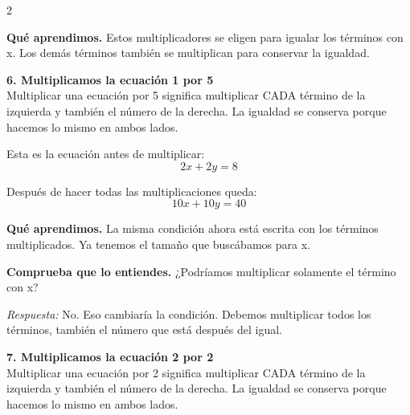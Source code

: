 \documentclass[11pt,a4paper,landscape]{article}
\begin{document}
\begin{multicols*}{2}
\begin{minipage}{\linewidth}
\par\smallskip\textbf{Qué aprendimos.} Estos multiplicadores se eligen para igualar los términos con x. Los demás términos también se multiplican para conservar la igualdad.
\end{minipage}\par\medskip
\noindent\begin{minipage}{\linewidth}\textbf{6. Multiplicamos la ecuación 1 por 5}\\[2pt]Multiplicar una ecuación por 5 significa multiplicar CADA término de la izquierda y también el número de la derecha. La igualdad se conserva porque hacemos lo mismo en ambos lados.
\par\smallskip Esta es la ecuación antes de multiplicar:
\[2x + 2y = 8\]
\par{}\par\smallskip
\par\smallskip Después de hacer todas las multiplicaciones queda:
\[10x + 10y = 40\]
\par\smallskip\textbf{Qué aprendimos.} La misma condición ahora está escrita con los términos multiplicados. Ya tenemos el tamaño que buscábamos para x.
\par\smallskip\textbf{Comprueba que lo entiendes.} ¿Podríamos multiplicar solamente el término con x?\par\textit{Respuesta:} No. Eso cambiaría la condición. Debemos multiplicar todos los términos, también el número que está después del igual.
\end{minipage}\par\medskip
\noindent\begin{minipage}{\linewidth}\textbf{7. Multiplicamos la ecuación 2 por 2}\\[2pt]Multiplicar una ecuación por 2 significa multiplicar CADA término de la izquierda y también el número de la derecha. La igualdad se conserva porque hacemos lo mismo en ambos lados.

\end{minipage}
\end{multicols*}
\end{document}
